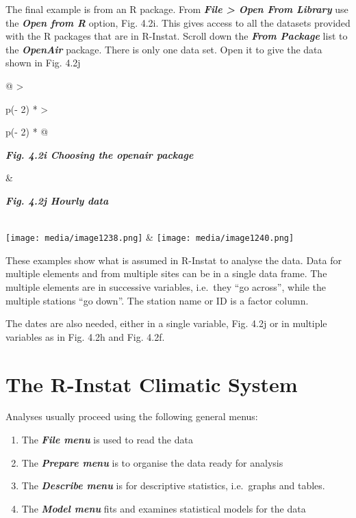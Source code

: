 \documentclass[
  letterpaper,
  DIV=11,
  numbers=noendperiod]{scrreprt}
\begin{document}
The final example is from an R package. From \textbf{\emph{File
\textgreater{} Open From Library}} use the \textbf{\emph{Open from R}}
option, Fig. 4.2i. This gives access to all the datasets provided with
the R packages that are in R-Instat. Scroll down the \textbf{\emph{From
Package}} list to the \textbf{\emph{OpenAir}} package. There is only one
data set. Open it to give the data shown in Fig. 4.2j

\begin{longtable}[]{@{}
  >{\raggedright\arraybackslash}p{(\columnwidth - 2\tabcolsep) * }
  >{\raggedright\arraybackslash}p{(\columnwidth - 2\tabcolsep) * }@{}}
\toprule\noalign{}
\begin{minipage}[b]{\linewidth}\raggedright
\textbf{\emph{Fig. 4.2i Choosing the openair package}}
\end{minipage} & \begin{minipage}[b]{\linewidth}\raggedright
\textbf{\emph{Fig. 4.2j Hourly data}}
\end{minipage} \\
\midrule\noalign{}
\endhead
\bottomrule\noalign{}
\endlastfoot
\texttt{[image: media/image1238.png]} &
\texttt{[image: media/image1240.png]} \\
\end{longtable}

These examples show what is assumed in R-Instat to analyse the data.
Data for multiple elements and from multiple sites can be in a single
data frame. The multiple elements are in successive variables, i.e.~they
``go across'', while the multiple stations ``go down''. The station name
or ID is a factor column.

The dates are also needed, either in a single variable, Fig. 4.2j or in
multiple variables as in Fig. 4.2h and Fig. 4.2f.

\section{The R-Instat Climatic
System}\label{the-r-instat-climatic-system}

Analyses usually proceed using the following general menus:

\begin{enumerate}
\def\labelenumi{\arabic{enumi}.}
\item
  The \textbf{\emph{File menu}} is used to read the data
\item
  The \textbf{\emph{Prepare menu}} is to organise the data ready for
  analysis
\item
  The \textbf{\emph{Describe menu}} is for descriptive statistics,
  i.e.~graphs and tables.
\item
  The \textbf{\emph{Model menu}} fits and examines statistical models
  for the data
\end{enumerate}
\end{document}
